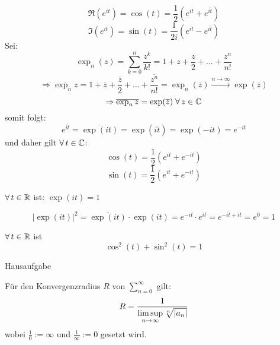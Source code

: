 \documentclass[../ana1u.tex]{subfiles}
\begin{document}
\[\Re(e^{it}) = \cos(t) = \frac{1}{2} (e^{it} + e^{\overline{it}}) \]
\[\Im(e^{it}) = \sin(t) = \frac{1}{2i} (e^{it} - e^{\overline{it}}) \]
Sei:
\[\exp_n(z) = \sum_{k=0}^{n} \frac{z^k}{k!} = 1 + z + \frac{z}{2} + \dots + \frac{z^n}{n!} \]
\[\Rightarrow \overline{\exp_n{z}} = 1 + \overline{z} + \frac{\overline{z}}{2} + \dots + \frac{\overline{z^n}}{n!} = \exp_n(\overline{z}) \overset{n \rightarrow \infty}{\rightarrow} \exp(\overline{z}) \]
\[\Rightarrow \overline{\exp_n{z}} = \exp(\overline{z}) \; \forall \, z \in \mathbb{C} \]
somit folgt:
\[e^{\overline{it}} = \overline{\exp(it)} = \exp(\overline{it}) = \exp(-it) = e^{-it} \]
und daher gilt \(\forall \, t \in \mathbb{C}\):
\[\cos(t) = \frac{1}{2} (e^{it} + e^{-it}) \]
\[\sin(t) = \frac{1}{2} (e^{it} + e^{-it}) \]
\begin{satz}
	\(\forall \, t \in \mathbb{R} \) ist: \(\exp(it) = 1 \)
\end{satz}
\begin{bew}
	\[|\exp(it)|^2 = \overline{\exp(it)} \cdot \exp(it) = e^{-it} \cdot e^{it} = e^{-it + it} = e^0 = 1 \]
\end{bew}
\begin{kor}
	\(\forall \, t \in \mathbb{R} \) ist 
	\[\cos^2(t) + \sin^2(t) = 1 \]
\end{kor}
\begin{bew}
	Hausaufgabe
\end{bew}
\begin{lem}
	Für den Konvergenzradius \(R\) von \(\sum_{n=0}^{\infty} \) gilt:
	\[R = \frac{1}{\limsup\limits_{n\rightarrow\infty}\sqrt[n]{|a_n|}} \]
	wobei \(\frac{1}{0} := \infty \) und \(\frac{1}{\infty} := 0 \) gesetzt wird.
\end{lem}
\end{document}
